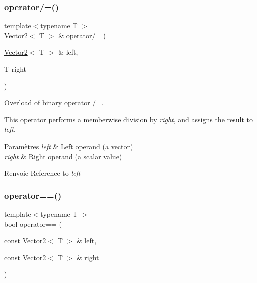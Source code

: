\subsubsection{\texorpdfstring{operator/=()}{operator/=()}}
{\footnotesize\ttfamily template$<$typename T $>$ \\
\hyperlink{classsf_1_1Vector2}{Vector2}$<$ T $>$ \& operator/= (\begin{DoxyParamCaption}\item[{\hyperlink{classsf_1_1Vector2}{Vector2}$<$ T $>$ \&}]{left,  }\item[{T}]{right }\end{DoxyParamCaption})\hspace{0.3cm}{\ttfamily [related]}}



Overload of binary operator /=. 

This operator performs a memberwise division by {\itshape right}, and assigns the result to {\itshape left}.


\begin{DoxyParams}{Paramètres}
{\em left} & Left operand (a vector) \\
\hline
{\em right} & Right operand (a scalar value)\\
\hline
\end{DoxyParams}
\begin{DoxyReturn}{Renvoie}
Reference to {\itshape left} 
\end{DoxyReturn}
\mbox{\label{classsf_1_1Vector2_a9a7b2d36c3850828fdb651facfd25136}} 
\subsubsection{\texorpdfstring{operator==()}{operator==()}}
{\footnotesize\ttfamily template$<$typename T $>$ \\
bool operator== (\begin{DoxyParamCaption}\item[{const \hyperlink{classsf_1_1Vector2}{Vector2}$<$ T $>$ \&}]{left,  }\item[{const \hyperlink{classsf_1_1Vector2}{Vector2}$<$ T $>$ \&}]{right }\end{DoxyParamCaption})\hspace{0.3cm}{\ttfamily [related]}}



